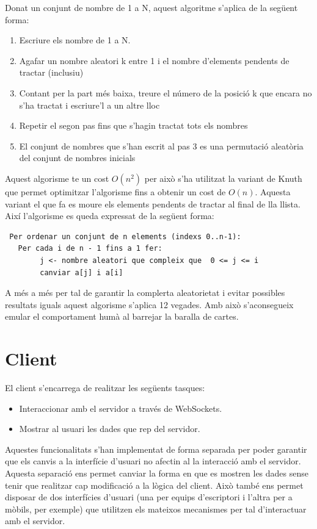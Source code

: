 Donat un conjunt de nombre de 1 a N, aquest algoritme s'aplica de la següent forma: 
\begin{enumerate}
\item{Escriure els nombre de 1 a N.}
\item{Agafar un nombre aleatori k entre 1 i el nombre d'elements pendents de tractar (inclusiu)}
\item{Contant per la part més baixa, treure el número de la posició k que encara no s'ha tractat i escriure'l a un altre lloc}
\item{Repetir el segon pas fins que s'hagin tractat tots els nombres}
\item{El conjunt de nombres que s'han escrit al pas 3 es una permutació aleatòria del conjunt de nombres inicials}
\end{enumerate}

Aquest algorisme te un cost $O(n^2)$ per això s'ha utilitzat la variant de Knuth que permet optimitzar l'algorisme fins a obtenir un cost de $O(n)$. Aquesta variant el que fa es moure els elements pendents de tractar al final de lla llista. Així l'algorisme es queda expressat de la següent forma: 

\begin{lstlisting}
 Per ordenar un conjunt de n elements (indexs 0..n-1):
   Per cada i de n - 1 fins a 1 fer:
        j <- nombre aleatori que compleix que  0 <= j <= i
        canviar a[j] i a[i]
\end{lstlisting}

A més a més per tal de garantir la complerta aleatorietat i evitar possibles resultats iguals aquest algorisme s'aplica 12 vegades. Amb això s'aconsegueix emular el comportament humà al barrejar la baralla de cartes. 

\section{Client}

El client s'encarrega de realitzar les següents tasques: 

\begin{itemize}
\item{Interaccionar amb el servidor a través de WebSockets.}
\item{Mostrar al usuari les dades que rep del servidor.}
\end{itemize}

Aquestes funcionalitats s'han implementat de forma separada per poder garantir que els canvis a la interfície d'usuari no afectin al la interacció amb el servidor. Aquesta separació ens permet canviar la forma en que es mostren les dades sense tenir que realitzar cap modificació a la lògica del client. Això també ens permet disposar de dos interfícies d'usuari (una per equips d'escriptori i l'altra per a mòbils, per exemple) que utilitzen els mateixos mecanismes per tal d'interactuar amb el servidor. 

